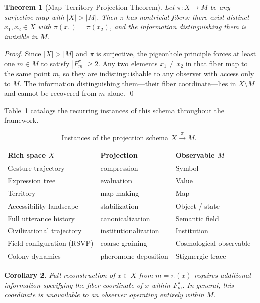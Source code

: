 \documentclass[12pt, a4paper, twoside]{article}
\theoremstyle{plain}
\newtheorem{theorem}{Theorem}[section]
\newtheorem{corollary}[theorem]{Corollary}
\theoremstyle{definition}
\theoremstyle{remark}
\newcommand{\Proj}{\pi}
\newcommand{\Fibover}[2]{F^{#1}_{#2}}
\begin{document}
\begin{theorem}[Map--Territory Projection Theorem]
\label{thm:map_territory}
Let $\Proj: X \to M$ be any surjective map with $|X| > |M|$. Then $\Proj$
has nontrivial fibers: there exist distinct $x_1, x_2 \in X$ with
$\Proj(x_1) = \Proj(x_2)$, and the information distinguishing them is
invisible in $M$.
\end{theorem}

\begin{proof}
Since $|X| > |M|$ and $\Proj$ is surjective, the pigeonhole principle forces
at least one $m \in M$ to satisfy $|\Fibover{\Proj}{m}| \geq 2$. Any two
elements $x_1 \neq x_2$ in that fiber map to the same point $m$, so they
are indistinguishable to any observer with access only to $M$. The information
distinguishing them---their fiber coordinate---lies in $X \setminus M$
and cannot be recovered from $m$ alone.
\qed
\end{proof}

Table~\ref{tab:projections} catalogs the recurring instances of this schema
throughout the framework.

\begin{table}[h]
\centering
\renewcommand{\arraystretch}{1.35}
\begin{tabular}{@{}lll@{}}
\toprule
\textbf{Rich space $X$} & \textbf{Projection} & \textbf{Observable $M$} \\
\midrule
Gesture trajectory    & compression         & Symbol \\
Expression tree       & evaluation          & Value \\
Territory             & map-making          & Map \\
Accessibility landscape & stabilization     & Object / state \\
Full utterance history  & canonicalization  & Semantic field \\
Civilizational trajectory & institutionalization & Institution \\
Field configuration (RSVP) & coarse-graining & Cosmological observable \\
Colony dynamics       & pheromone deposition & Stigmergic trace \\
\bottomrule
\end{tabular}
\caption{Instances of the projection schema $X \xrightarrow{\Proj} M$.}
\label{tab:projections}
\end{table}

\begin{corollary}
\label{cor:fiber_reconstruction}
Full reconstruction of $x \in X$ from $m = \Proj(x)$ requires additional
information specifying the fiber coordinate of $x$ within $\Fibover{\Proj}{m}$.
In general, this coordinate is unavailable to an observer operating entirely
within $M$.
\end{corollary}
\end{document}
